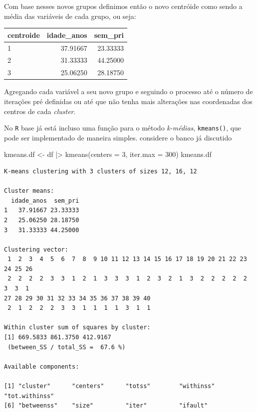 \documentclass[
  letterpaper,
  DIV=11,
  numbers=noendperiod]{scrreprt}
\newenvironment{Shaded}{\begin{snugshade}}{\end{snugshade}}
\newcommand{\AttributeTok}[1]{\textcolor[rgb]{0.40,0.45,0.13}{#1}}
\newcommand{\DecValTok}[1]{\textcolor[rgb]{0.68,0.00,0.00}{#1}}
\newcommand{\FunctionTok}[1]{\textcolor[rgb]{0.28,0.35,0.67}{#1}}
\newcommand{\NormalTok}[1]{\textcolor[rgb]{0.00,0.23,0.31}{#1}}
\newcommand{\OtherTok}[1]{\textcolor[rgb]{0.00,0.23,0.31}{#1}}
\newcommand{\SpecialCharTok}[1]{\textcolor[rgb]{0.37,0.37,0.37}{#1}}
\begin{document}
Com base nesses novos grupos definimos então o novo centróide como sendo
a média das variáveis de cada grupo, ou seja:

\begin{longtable}[]{@{}lrr@{}}
\toprule()
centroide & idade\_anos & sem\_pri \\
\midrule()
\endhead
1 & 37.91667 & 23.33333 \\
2 & 31.33333 & 44.25000 \\
3 & 25.06250 & 28.18750 \\
\bottomrule()
\end{longtable}

Agregando cada variável a seu novo grupo e seguindo o processo até o
número de iterações pré definidas ou até que não tenha mais alterações
nas coordenadas dos centros de cada \emph{cluster}.

No \texttt{R} base já está incluso uma função para o método
\emph{k-médias}, \texttt{kmeans()}, que pode ser implementado de maneira
simples. considere o banco já discutido

\begin{Shaded}
\begin{Highlighting}[]
\NormalTok{kmeans.df }\OtherTok{\textless{}{-}}\NormalTok{ df }\SpecialCharTok{|\textgreater{}}
  \FunctionTok{kmeans}\NormalTok{(}\AttributeTok{centers =} \DecValTok{3}\NormalTok{, }\AttributeTok{iter.max =} \DecValTok{300}\NormalTok{)}
\NormalTok{kmeans.df}
\end{Highlighting}
\end{Shaded}

\begin{verbatim}
K-means clustering with 3 clusters of sizes 12, 16, 12

Cluster means:
  idade_anos  sem_pri
1   37.91667 23.33333
2   25.06250 28.18750
3   31.33333 44.25000

Clustering vector:
 1  2  3  4  5  6  7  8  9 10 11 12 13 14 15 16 17 18 19 20 21 22 23 24 25 26 
 2  2  2  2  3  3  1  2  1  3  3  3  1  2  3  2  1  3  2  2  2  2  2  3  3  1 
27 28 29 30 31 32 33 34 35 36 37 38 39 40 
 2  1  2  2  2  3  3  1  1  1  1  3  1  1 

Within cluster sum of squares by cluster:
[1] 669.5833 861.3750 412.9167
 (between_SS / total_SS =  67.6 %)

Available components:

[1] "cluster"      "centers"      "totss"        "withinss"     "tot.withinss"
[6] "betweenss"    "size"         "iter"         "ifault"      
\end{verbatim}
\end{document}
